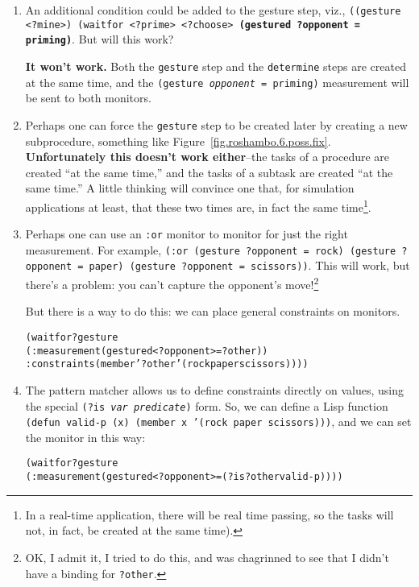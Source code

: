 \documentclass[12pt]{article}
\newcommand{\ic}{\texttt}
\newenvironment{code}%
   {\begin{alltt}}%
   {\end{alltt}}
\newcommand{\codeit}[1]{{\it #1}}
\newcommand{\codebf}[1]{{\bf #1}}
\begin{document}
\begin{enumerate}
\item An additional condition could be added to the gesture step, viz., \ic{((gesture <?mine>) (waitfor <?prime> <?choose> \codebf{(gestured ?opponent = priming)}}. But will this work?

\textbf{It won't work.} Both the \ic{gesture} step and the \ic{determine} steps are created at the same time, and the \ic{(gesture \codeit{opponent} = priming)} measurement will be sent to both monitors. 

\item Perhaps one can force the \ic{gesture} step to be created later by creating a new subprocedure, something like Figure~\ref{fig.roshambo.6.poss.fix}. \textbf{Unfortunately this doesn't work either}--the tasks of a procedure are created ``at the same time,'' and  the tasks of a subtask are created ``at the same time.'' A little thinking will convince one that, for simulation applications at least, that these two times are, in fact the same time\footnote{In a real-time application, there will be real time passing, so the tasks will not, in fact, be created at the same time).}. 

\item Perhaps one can use an \ic{:or} monitor to monitor for just the right measurement. For example, \ic{(:or (gesture ?opponent = rock) (gesture ?opponent = paper) (gesture ?opponent = scissors))}. This will work, but there's a problem: you can't capture the opponent's move!\footnote{OK, I admit it, I tried to do this, and was chagrinned to see that I didn't have a binding for \ic{?other}.}

But there is a way to do this: we can place general constraints on monitors. 
\begin{code}
  (waitfor ?gesture 
   (:measurement (gestured <?opponent> = ?other))
   :constraints (member '?other '(rock paper scissors))))
\end{code}

\item The pattern matcher allows us to define constraints directly on values, using the special \ic{(?is \textit{var} \textit{predicate})} form. So, we can define a Lisp function \ic{(defun valid-p (x)
  (member x '(rock paper scissors)))}, and we can set the monitor in this way:

\begin{code}
  (waitfor ?gesture 
   (:measurement (gestured <?opponent> = (?is ?other valid-p))))
\end{code}

\end{enumerate}
\end{document}
